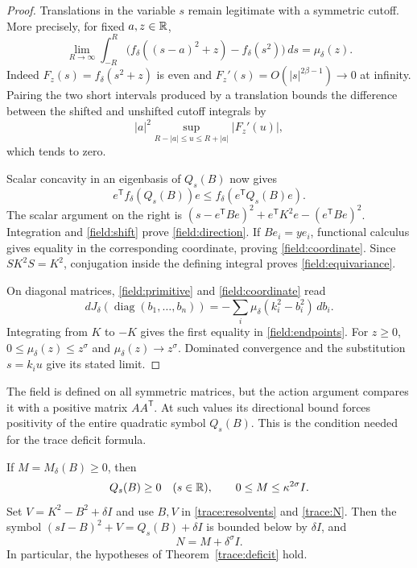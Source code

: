 \begin{proof}
Translations in the variable $s$ remain legitimate with a
symmetric cutoff.  More precisely, for fixed $a,z\in\mathbb R$,
\begin{equation}\label{field:shift}
 \lim_{R\to\infty}\int_{-R}^{R}
   \bigl(f_\delta((s-a)^2+z)-f_\delta(s^2)\bigr)\,ds
          =\mu_\delta(z).
\end{equation}
Indeed $F_z(s)=f_\delta(s^2+z)$ is even and
$F_z'(s)=O(|s|^{2\beta-1})\to0$ at infinity.  Pairing the two
short intervals produced by a translation bounds the difference
between the shifted and unshifted cutoff integrals by
\[
 |a|^2\sup_{R-|a|\leq u\leq R+|a|}|F_z'(u)|,
\]
which tends to zero.

Scalar concavity in an eigenbasis of $Q_s(B)$ now gives
\[
 e^{\mathsf T}f_\delta(Q_s(B))e
     \leq f_\delta(e^{\mathsf T}Q_s(B)e).
\]
The scalar argument on the right is
$(s-e^{\mathsf T}Be)^2+e^{\mathsf T}K^2e-(e^{\mathsf T}Be)^2$.
Integration and \eqref{field:shift} prove \eqref{field:direction}.
If $Be_i=ye_i$, functional calculus gives equality in the
corresponding coordinate, proving \eqref{field:coordinate}.
Since $SK^2S=K^2$, conjugation inside the defining integral proves
\eqref{field:equivariance}.

On diagonal matrices, \eqref{field:primitive} and
\eqref{field:coordinate} read
\[
 dJ_\delta(\operatorname{diag}(b_1,\ldots,b_n))
       =-\sum_i\mu_\delta(k_i^2-b_i^2)\,db_i.
\]
Integrating from $K$ to $-K$ gives the first equality in
\eqref{field:endpoints}.  For $z\geq0$,
$0\leq\mu_\delta(z)\leq z^\sigma$ and
$\mu_\delta(z)\to z^\sigma$.  Dominated convergence and the
substitution $s=k_i u$ give its stated limit.
\end{proof}

The field is defined on all symmetric matrices, but the action
argument compares it with a positive matrix $AA^{\mathsf T}$.
At such values its directional bound forces positivity of the
entire quadratic symbol $Q_s(B)$.  This is the condition needed
for the trace deficit formula.

\begin{proposition}\label{field:positive}
If $M=M_\delta(B)\geq0$, then
\begin{equation}\label{field:positive-bounds}
 Q_s(B)\geq0\quad(s\in\mathbb R),\qquad
             0\leq M\leq\kappa^{2\sigma}I.
\end{equation}
Set $V=K^2-B^2+\delta I$ and use $B,V$ in
\eqref{trace:resolvents} and \eqref{trace:N}.  Then the symbol
$(sI-B)^2+V=Q_s(B)+\delta I$ is bounded below by $\delta I$, and
\begin{equation}\label{field:N}
                         N=M+\delta^\sigma I.
\end{equation}
In particular, the hypotheses of Theorem~\ref{trace:deficit} hold.
\end{proposition}

